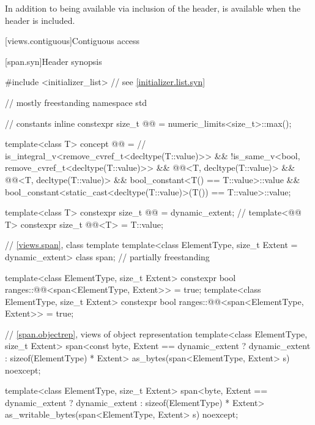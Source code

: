\pnum
In addition to being available via inclusion of the  header,
 is available when the header  is included.

[views.contiguous]{Contiguous access}

[span.syn]{Header  synopsis}%

%
\begin{codeblock}
#include <initializer_list>     // see \ref{initializer.list.syn}

// mostly freestanding
namespace std {
  // constants
  inline constexpr size_t @@ = numeric_limits<size_t>::max();

  template<class T>
    concept @@ =                    // \expos
      is_integral_v<remove_cvref_t<decltype(T::value)>> &&
      !is_same_v<bool, remove_cvref_t<decltype(T::value)>> &&
      @@<T, decltype(T::value)> &&
      @@<T, decltype(T::value)> &&
      bool_constant<T() == T::value>::value &&
      bool_constant<static_cast<decltype(T::value)>(T()) == T::value>::value;

  template<class T>
    constexpr size_t @@ = dynamic_extent; // \expos
  template<@@ T>
    constexpr size_t @@<T> = {T::value};

  // \ref{views.span}, class template 
  template<class ElementType, size_t Extent = dynamic_extent>
    class span;                                                             // partially freestanding

  template<class ElementType, size_t Extent>
    constexpr bool ranges::@@<span<ElementType, Extent>> = true;
  template<class ElementType, size_t Extent>
    constexpr bool ranges::@@<span<ElementType, Extent>> = true;

  // \ref{span.objectrep}, views of object representation
  template<class ElementType, size_t Extent>
    span<const byte, Extent == dynamic_extent ? dynamic_extent : sizeof(ElementType) * Extent>
      as_bytes(span<ElementType, Extent> s) noexcept;

  template<class ElementType, size_t Extent>
    span<byte, Extent == dynamic_extent ? dynamic_extent : sizeof(ElementType) * Extent>
      as_writable_bytes(span<ElementType, Extent> s) noexcept;
}
\end{codeblock}

